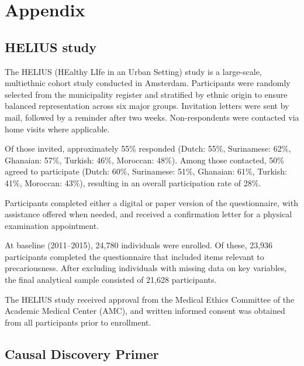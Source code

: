 \documentclass[
]{article}
\begin{document}
\section{Appendix}\label{sec-appendix}

\subsection{HELIUS study}\label{sec-helius}

The HELIUS (HEalthy LIfe in an Urban Setting) study is a large-scale,
multiethnic cohort study conducted in Amsterdam. Participants were
randomly selected from the municipality register and stratified by
ethnic origin to ensure balanced representation across six major groups.
Invitation letters were sent by mail, followed by a reminder after two
weeks. Non-respondents were contacted via home visits where applicable.

Of those invited, approximately 55\% responded (Dutch: 55\%, Surinamese:
62\%, Ghanaian: 57\%, Turkish: 46\%, Moroccan: 48\%). Among those
contacted, 50\% agreed to participate (Dutch: 60\%, Surinamese: 51\%,
Ghanaian: 61\%, Turkish: 41\%, Moroccan: 43\%), resulting in an overall
participation rate of 28\%.

Participants completed either a digital or paper version of the
questionnaire, with assistance offered when needed, and received a
confirmation letter for a physical examination appointment.

At baseline (2011--2015), 24,780 individuals were enrolled. Of these,
23,936 participants completed the questionnaire that included items
relevant to precariousness. After excluding individuals with missing
data on key variables, the final analytical sample consisted of 21,628
participants.

The HELIUS study received approval from the Medical Ethics Committee of
the Academic Medical Center (AMC), and written informed consent was
obtained from all participants prior to enrollment.

\subsection{Causal Discovery Primer}\label{sec-causalprimer}
\end{document}
